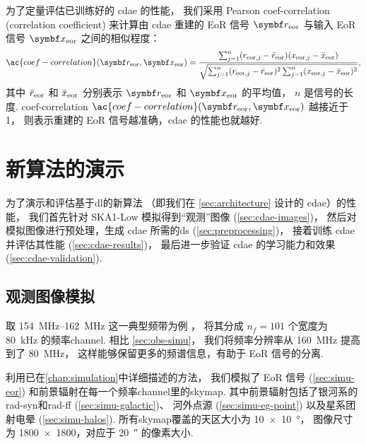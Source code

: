 为了定量评估已训练好的 \ac{cdae} 的性能，
我们采用 Pearson \acl{coef-correlation} (correlation coefficient)
\cite{harker2009,chapman2013}
来计算由 \ac{cdae} 重建的 EoR 信号 $\B{r}_{\R{eor}}$ 与输入 EoR 信号
$\B{x}_{\R{eor}}$ 之间的相似程度：
\begin{equation}
  \label{eq:corrcoef}
  \ac{coef-correlation}(\B{r}_{\R{eor}}, \B{x}_{\R{eor}})
      = \frac{\sum_{j=1}^{n}(r_{\R{eor},j} - \bar{r}_{\R{eor}})
            (x_{\R{eor},j} - \bar{x}_{\R{eor}})}{
          \sqrt{\sum_{j=1}^{n}(r_{\R{eor},j} - \bar{r}_{\R{eor}})^2
            \sum_{j=1}^{n}(x_{\R{eor},j} - \bar{x}_{\R{eor}})^2}
        } ,
\end{equation}
其中
$\bar{r}_{\mathrm{eor}}$ 和 $\bar{x}_{\mathrm{eor}}$ 分别表示
$\B{r}_{\R{eor}}$ 和 $\B{x}_{\R{eor}}$ 的平均值，
$n$ 是信号的长度.
\acl{coef-correlation}
$\ac{coef-correlation}(\B{r}_{\R{eor}}, \B{x}_{\R{eor}})$ 越接近于 1，
则表示重建的 EoR 信号越准确，\ac{cdae} 的性能也就越好.


\section{新算法的演示}
\label{sec:cdae-demo}

为了演示和评估基于\ac{dl}的新算法
（即我们在 \autoref{sec:architecture} 设计的 \ac{cdae}）的性能，
我们首先针对 SKA1-Low 模拟得到\enquote{观测}图像 (\autoref{sec:cdae-images})，
然后对模拟图像进行预处理，生成 \ac{cdae} 所需的\ac{ds} (\autoref{sec:preprocessing})，
接着训练 \ac{cdae} 并评估其性能 (\autoref{sec:cdae-results})，
最后进一步验证 \ac{cdae} 的学习能力和效果 (\autoref{sec:cdae-validation}).

\subsection{观测图像模拟}
\label{sec:cdae-images}

取 \SIrange{154}{162}{\MHz} 这一典型频带为例 \cite{datta2010}，
将其分成 $n_f = 101$ 个宽度为 \SI{80}{\kHz} 的频率\ac{channel}.
相比 \autoref{sec:obs-simu}，
我们将频率分辨率从 \SI{160}{\MHz} 提高到了 \SI{80}{\MHz}，
这样能够保留更多的频谱信息，有助于 EoR 信号的分离.

利用已在\autoref{chap:simulation}中详细描述的方法，
我们模拟了 EoR 信号 (\autoref{sec:simu-eor})
和前景辐射在每一个频率\ac{channel}里的\ac{skymap}.
其中前景辐射包括了银河系的\ac{rad-syn}和\ac{rad-ff} (\autoref{sec:simu-galactic})、
河外点源 (\autoref{sec:simu-eg-point})
以及星系团射电晕 (\autoref{sec:simu-halos}).
所有\ac{skymap}覆盖的天区大小为 \SI{10 x 10}{\degree}，
图像尺寸为 \num{1800 x 1800}，对应于 \SI{20}{\arcsecond} 的像素大小.

